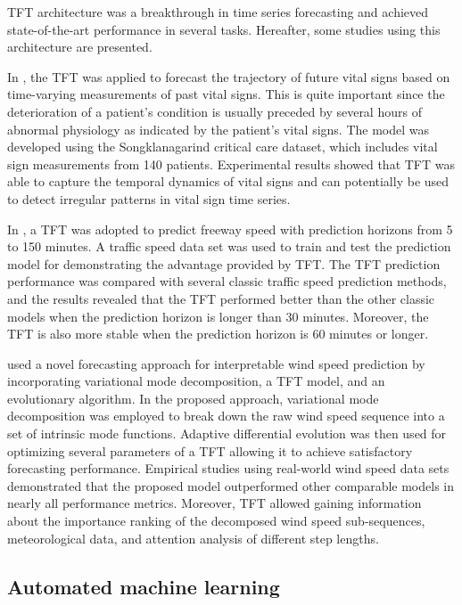 TFT architecture was a breakthrough in time series forecasting and achieved state-of-the-art performance in several tasks.
Hereafter, some studies using this architecture are presented.

In \cite{9745215}, the TFT was applied to forecast the trajectory of future vital signs based on time-varying measurements of past vital signs.
This is quite important since the deterioration of a patient’s condition is usually preceded by several hours of abnormal physiology as indicated by the patient’s vital signs.
The model was developed using the Songklanagarind critical care dataset, which includes vital sign measurements from 140 patients.
Experimental results showed that TFT was able to capture the temporal dynamics of vital signs and can potentially be used to detect irregular patterns in vital sign time series.

In \cite{ZHANG2022329}, a TFT was adopted to predict freeway speed with prediction horizons from 5 to 150 minutes.
A traffic speed data set was used to train and test the prediction model for demonstrating the advantage provided by TFT.
The TFT prediction performance was compared with several classic traffic speed prediction methods, and the results revealed that the TFT performed better than the other classic models when the prediction horizon is longer than 30 minutes.
Moreover, the TFT is also more stable when the prediction horizon is 60 minutes or longer.

\cite{WU2022123990} used a novel forecasting approach for interpretable wind speed prediction by incorporating variational mode decomposition, a TFT model, and an evolutionary algorithm.
In the proposed approach, variational mode decomposition was employed to break down the raw wind speed sequence into a set of intrinsic mode functions.
Adaptive differential evolution was then used for optimizing several parameters of a TFT allowing it to achieve satisfactory forecasting performance.
Empirical studies using real-world wind speed data sets demonstrated that the proposed model outperformed other comparable models in nearly all performance metrics.
Moreover, TFT allowed gaining information about the importance ranking of the decomposed wind speed sub-sequences, meteorological data, and attention analysis of different step lengths.


\vspace{0.1 cm}
\subsection{Automated machine learning}
\label{sec:automl}
\vspace{0.1 cm}

